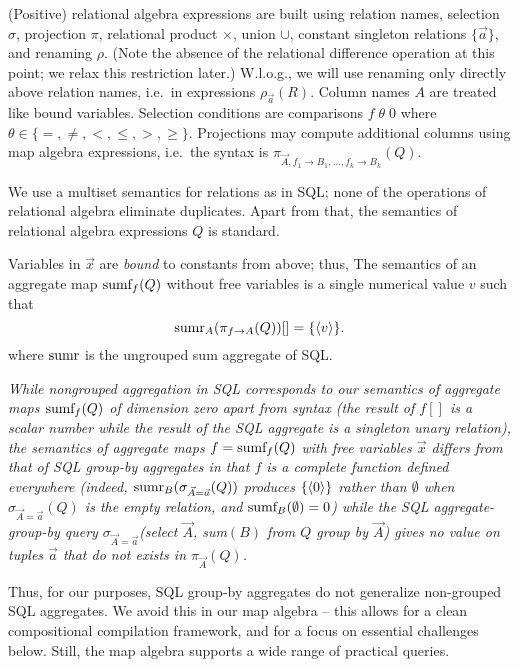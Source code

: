 (Positive) relational algebra expressions are built using relation names,
selection $\sigma$, projection $\pi$, relational product $\times$, union $\cup$,
constant singleton relations $\{\vec{a}\}$,
and renaming $\rho$.
(Note the absence of the relational difference operation at this point; we
relax this restriction later.)
W.l.o.g., we will use renaming only directly above relation names, i.e.\ in expressions
$\rho_{\vec{a}}(R)$.
Column names $A$ are treated like bound variables.
Selection conditions are comparisons
$f \;\theta\; 0$ where $\theta \in \{ =, \neq, <, \le, >, \ge \}$.
Projections may compute additional columns
using map algebra expressions, i.e.\ the syntax is
$\pi_{\vec{A}, f_1 \rightarrow B_1, \dots, f_k \rightarrow B_k}(Q)$. 

We use a multiset semantics for relations as in SQL; none of the operations
of relational algebra eliminate duplicates.
Apart from that, the semantics of relational algebra expressions $Q$ is standard.

Variables
in $\vec{x}$ are {\em bound}\/ to constants from above; thus, 
The semantics of an
aggregate map $\mbox{sumf}_f(Q)$ without free variables
is a single numerical value $v$ such that
\[
\mbox{sumr}_A(\pi_{f \rightarrow A}(Q))[] = \{ {\langle v\rangle} \}.
\]
where $\mbox{sumr}$ is the ungrouped sum aggregate of SQL.


\begin{remark}\em
While nongrouped aggregation in SQL corresponds to our semantics of aggregate
maps $\mbox{sumf}_f(Q)$ of dimension zero apart from syntax (the result of $f[]$ is a scalar number
while the result of the SQL aggregate is a singleton unary relation),
the semantics of aggregate maps $f = \mbox{sumf}_f(Q)$ with
free variables $\vec{x}$ differs from that
of SQL group-by aggregates in that $f$ is a complete function defined everywhere
(indeed, $\mbox{sumr}_B(\sigma_{\vec{A}=\vec{a}}(Q))$ produces $\{{\langle0\rangle}\}$ rather
than $\emptyset$ when $\sigma_{\vec{A}=\vec{a}}(Q)$ is the empty relation, and
$\mbox{sumf}_B(\emptyset) = 0$) while
the SQL aggregate-group-by query
$\sigma_{\vec{A}=\vec{a}}$(select $\vec{A}$, sum$(B)$ from $Q$ group by $\vec{A}$)
gives no value on tuples $\vec{a}$ that do not exists in $\pi_{\vec{A}}(Q)$.

Thus, for our purposes, SQL group-by aggregates do not generalize non-grouped
SQL aggregates. We avoid this in our map algebra -- this allows for a clean
compositional compilation framework, and for a focus on essential challenges
below. Still, the map algebra supports a wide range of practical queries.
\end{remark}


